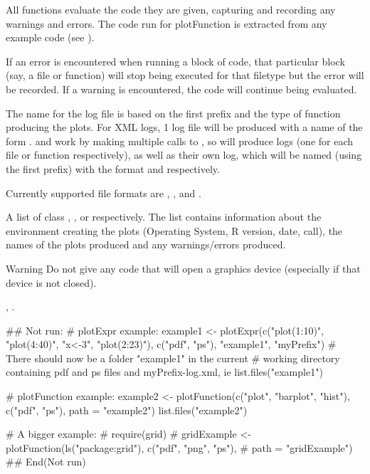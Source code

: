 \documentclass[a4paper,oneside]{report}
\begin{document}
\begin{Details}\relax
All functions evaluate the code they are given, capturing and recording any
warnings and errors. The code run for plotFunction is extracted from
any example code (see ).

If an error is encountered when running a block of code, that
particular block (say, a file or function) will stop being executed
for that filetype but the error will be recorded. If a warning is
encountered, the code will continue being evaluated.

The name for the log file is based on the first prefix and the type of
function producing the plots. For  XML logs, 1 log file
will be produced with a name of the form .
 and  work by making multiple calls
to , so will produce  logs (one for each
file or function respectively), as well as their own log, which will
be named (using the first prefix) with the format 
and  respectively.

Currently supported file formats are , , and
.
\end{Details}
\begin{Value}
A list of class , , or
 respectively. The list contains
information about the environment creating the plots (Operating
System, R version, date, call), the names of the plots produced and
any warnings/errors produced.
\end{Value}
\begin{Section}{Warning}
Do not give any code that will open a graphics device (especially if
that device is not closed).
\end{Section}
\begin{SeeAlso}\relax
{}, .
\end{SeeAlso}
\begin{Examples}
\begin{ExampleCode}
## Not run: 
  # plotExpr example:
  example1 <- plotExpr(c("plot(1:10)", "plot(4:40)", "x<-3", "plot(2:23)"),
                       c("pdf", "ps"), "example1", "myPrefix")
  # There should now be a folder "example1" in the current
  # working directory containing pdf and ps files and myPrefix-log.xml, ie
  list.files("example1")

  # plotFunction example:
  example2 <- plotFunction(c("plot", "barplot", "hist"), c("pdf", "ps"),
                           path = "example2")
  list.files("example2")

  # A bigger example:
  # require(grid)
  # gridExample <- plotFunction(ls("package:grid"), c("pdf", "png", "ps"),
  #                             path = "gridExample")
## End(Not run)
\end{ExampleCode}
\end{Examples}
\end{document}
